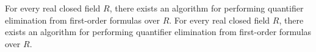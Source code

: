 For every real closed field \(R\), there exists an algorithm for performing quantifier elimination from first-order formulas over \(R\).
For every real closed field \(R\), there exists an algorithm for performing quantifier elimination from first-order formulas over \(R\).
